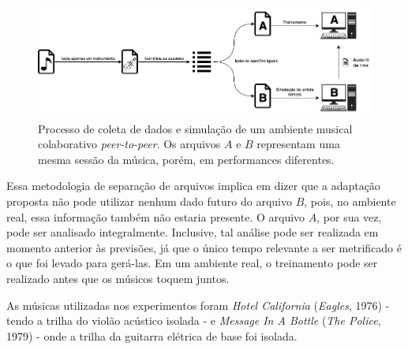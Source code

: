 \begin{figure}[htbp]
\centering
\includegraphics[width=1\textwidth]{images/data-gathering.png}
\caption{Processo de coleta de dados e simulação de um ambiente musical colaborativo \textit{peer-to-peer}. Os arquivos $A$ e $B$ representam uma mesma sessão da música, porém, em performances diferentes.}
\label{fig:data_gathering}
\end{figure}

Essa metodologia de separação de arquivos implica em dizer que a adaptação proposta não pode utilizar nenhum dado futuro do arquivo $B$, pois, no ambiente real, essa informação também não estaria presente. O arquivo $A$, por sua vez, pode ser analisado integralmente. Inclusive, tal análise pode ser realizada em momento anterior às previsões, já que o único tempo relevante a ser metrificado é o que foi levado para gerá-las. Em um ambiente real, o treinamento pode ser realizado antes que os músicos toquem juntos.

As músicas utilizadas nos experimentos foram \textit{Hotel California} (\textit{Eagles}, 1976) - tendo a trilha do violão acústico isolada - e \textit{Message In A Bottle} (\textit{The Police}, 1979) - onde a trilha da guitarra elétrica de base foi isolada.
